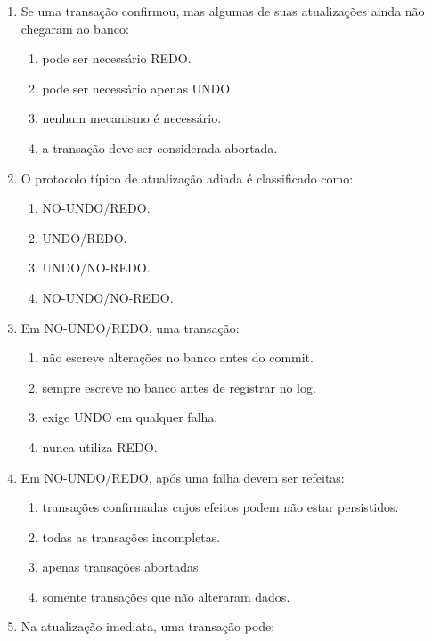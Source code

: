 \documentclass[12pt,a4paper]{article}
\begin{document}
\begin{enumerate}[label=\textbf{Q\arabic*.}]
\item Se uma transação confirmou, mas algumas de suas atualizações ainda não chegaram ao banco:

\begin{enumerate}[label=\alph*)]
    \item pode ser necessário REDO.
    \item pode ser necessário apenas UNDO.
    \item nenhum mecanismo é necessário.
    \item a transação deve ser considerada abortada.
\end{enumerate}

\item O protocolo típico de atualização adiada é classificado como:

\begin{enumerate}[label=\alph*)]
    \item NO-UNDO/REDO.
    \item UNDO/REDO.
    \item UNDO/NO-REDO.
    \item NO-UNDO/NO-REDO.
\end{enumerate}

\item Em NO-UNDO/REDO, uma transação:

\begin{enumerate}[label=\alph*)]
    \item não escreve alterações no banco antes do commit.
    \item sempre escreve no banco antes de registrar no log.
    \item exige UNDO em qualquer falha.
    \item nunca utiliza REDO.
\end{enumerate}

\item Em NO-UNDO/REDO, após uma falha devem ser refeitas:

\begin{enumerate}[label=\alph*)]
    \item transações confirmadas cujos efeitos podem não estar persistidos.
    \item todas as transações incompletas.
    \item apenas transações abortadas.
    \item somente transações que não alteraram dados.
\end{enumerate}

\item Na atualização imediata, uma transação pode:


\end{enumerate}
\end{document}
